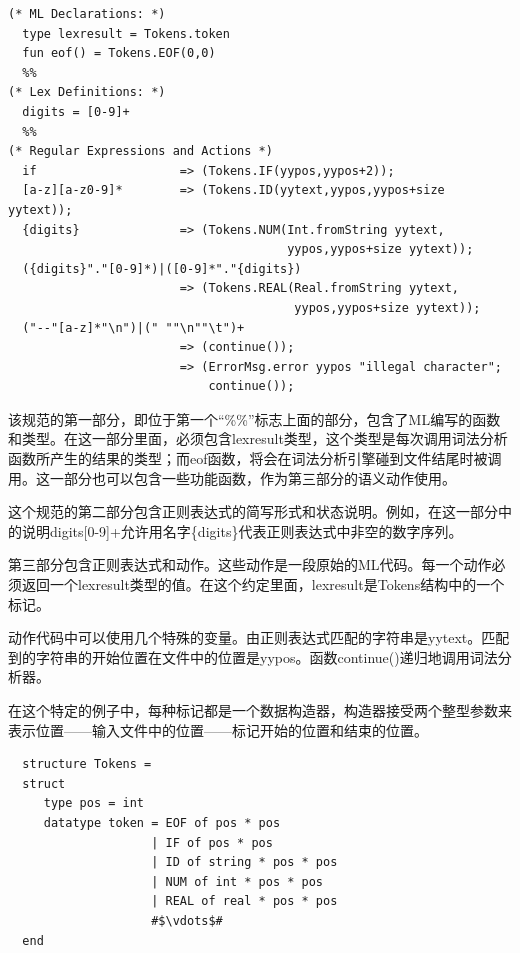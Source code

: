 \documentclass[cn,11pt,chinese]{elegantbook}
\newenvironment{code}{\captionsetup{type=listing}}{}
\begin{document}
\begin{code}
\label{code:2}
\begin{verbatim}
(* ML Declarations: *)
  type lexresult = Tokens.token
  fun eof() = Tokens.EOF(0,0)
  %%
(* Lex Definitions: *)
  digits = [0-9]+
  %%
(* Regular Expressions and Actions *)
  if                    => (Tokens.IF(yypos,yypos+2));
  [a-z][a-z0-9]*        => (Tokens.ID(yytext,yypos,yypos+size yytext));
  {digits}              => (Tokens.NUM(Int.fromString yytext,
                                       yypos,yypos+size yytext));
  ({digits}"."[0-9]*)|([0-9]*"."{digits})
                        => (Tokens.REAL(Real.fromString yytext,
                                        yypos,yypos+size yytext));
  ("--"[a-z]*"\n")|(" ""\n""\t")+
                        => (continue());
                        => (ErrorMsg.error yypos "illegal character";
                            continue());
\end{verbatim}
\end{code}

该规范的第一部分，即位于第一个“\%\%”标志上面的部分，包含了ML编写的函数和类型。在这一部分里面，必须包含lexresult类型，这个类型是每次调用词法分析函数所产生的结果的类型；而eof函数，将会在词法分析引擎碰到文件结尾时被调用。这一部分也可以包含一些功能函数，作为第三部分的语义动作使用。

这个规范的第二部分包含正则表达式的简写形式和状态说明。例如，在这一部分中的说明digits[0-9]+允许用名字\{digits\}代表正则表达式中非空的数字序列。

第三部分包含正则表达式和动作。这些动作是一段原始的ML代码。每一个动作必须返回一个lexresult类型的值。在这个约定里面，lexresult是Tokens结构中的一个标记。

动作代码中可以使用几个特殊的变量。由正则表达式匹配的字符串是yytext。匹配到的字符串的开始位置在文件中的位置是yypos。函数continue()递归地调用词法分析器。

在这个特定的例子中，每种标记都是一个数据构造器，构造器接受两个整型参数来表示位置——输入文件中的位置——标记开始的位置和结束的位置。

\begin{verbatim}
  structure Tokens =
  struct
     type pos = int
     datatype token = EOF of pos * pos
                    | IF of pos * pos
                    | ID of string * pos * pos
                    | NUM of int * pos * pos
                    | REAL of real * pos * pos
                    #$\vdots$#
  end
\end{verbatim}
\end{document}
